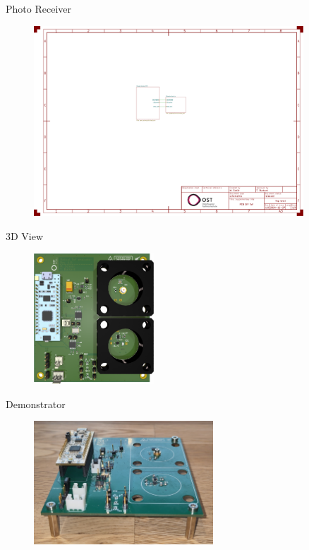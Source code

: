 \begin{frame}{Photo Receiver}
    \begin{figure}
        \includegraphics[page=3, trim=100 240 600 340, clip, width=0.9\textwidth]{../documentation/attachments/schematic.pdf}
    \end{figure}

    \iconoptical
\end{frame}

\begin{frame}{3D View}
    \begin{figure}
        \includegraphics[width=0.4\textwidth]{../documentation/graphics/3d_top.png}
    \end{figure}
\end{frame}

\begin{frame}{Demonstrator}
    \begin{figure}
        \includegraphics[width=0.6\textwidth]{../documentation/graphics/photo_demonstrator_front_wo_lens.jpg}
    \end{figure}
\end{frame}

